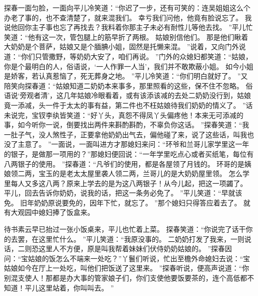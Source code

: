 探春一面匀脸，一面向平儿冷笑道：“你迟了一步，还有可笑的：连吴姐姐这么个办老了事的，也不查清楚了，就来混我们。
幸亏我们问他，他竟有脸说忘了。
我说他回你主子事也忘了再找去？我料着你那主子未必有耐性儿等他去找。
”平儿忙笑道：“他有这一次，管包腿上的筋早折了两根。
姑娘别信他们。
那是他们瞅着大奶奶是个菩萨，姑娘又是个腼腆小姐，固然是托懒来混。
”说着，又向门外说道：“你们只管撒野，等奶奶大安了，咱们再说。
”门外的众媳妇都笑道：“姑娘，你是个最明白的人，俗语说，‘一人作罪一人当’，我们并不敢欺蔽小姐。
如今小姐是娇客，若认真惹恼了，死无葬身之地。
”平儿冷笑道：“你们明白就好了。
”又陪笑向探春道：“姑娘知道二奶奶本来事多，那里照看的这些，保不住不忽略。
俗语说‘旁观者清’，这几年姑娘冷眼看着，或有该添该减的去处二奶奶没行到，姑娘竟一添减，头一件于太太的事有益，第二件也不枉姑娘待我们奶奶的情义了。
”话未说完，宝钗李纨皆笑道：“好丫头，真怨不得凤丫头偏疼他！本来无可添减的事，如今听你一说，倒要找出两件来斟酌斟酌，不辜负你这话。
”探春笑道：“我一肚子气，没人煞性子，正要拿他奶奶出气去，偏他碰了来，说了这些话，叫我也没了主意了。
”一面说，一面叫进方才那媳妇来问：“环爷和兰哥儿家学里这一年的银子，是做那一项用的？”那媳妇便回说：“一年学里吃点心或者买纸笔，每位有八两银子的使用。
”探春道：“凡爷们的使用，都是各屋领了月钱的。
环哥的是姨娘领二两，宝玉的是老太太屋里袭人领二两，兰哥儿的是大奶奶屋里领。
怎么学里每人又多这八两？原来上学去的是为这八两银子！从今儿起，把这一项蠲了。
平儿，回去告诉你奶奶，说我的话，把这一条务必免了。
”平儿笑道：“早就该免。
旧年奶奶原说要免的，因年下忙，就忘了。
”那个媳妇只得答应着去了。
就有大观园中媳妇捧了饭盒来。
\par
待书素云早已抬过一张小饭桌来，平儿也忙着上菜。
探春笑道：“你说完了话干你的去罢，在这里忙什么。
”平儿笑道：“我原没事的。
二奶奶打发了我来，一则说话，二则恐这里人不方便，原是叫我帮着妹妹们伏侍奶奶姑娘的。
”探春因问：“宝姑娘的饭怎么不端来一处吃？”丫鬟们听说，忙出至檐外命媳妇去说：“宝姑娘如今在厅上一处吃，叫他们把饭送了这里来。
”探春听说，便高声说道：“你别混支使人！那都是办大事的管家娘子们，你们支使他要饭要茶的，连个高低都不知道！平儿这里站着，你叫叫去。
”\par
